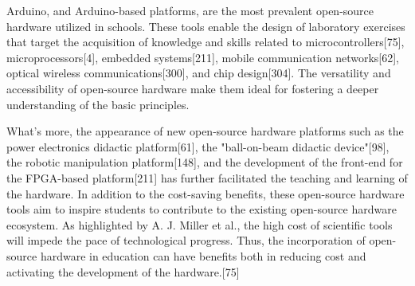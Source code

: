 \documentclass[final-report.tex]{subfiles}
\begin{document}
Arduino, and Arduino-based platforms, are the most prevalent open-source hardware utilized in schools. 
These tools enable the design of laboratory exercises that target the acquisition of knowledge and skills related to microcontrollers[75], microprocessors[4], embedded systems[211], mobile communication networks[62], optical wireless communications[300], and chip design[304]. 
The versatility and accessibility of open-source hardware make them ideal for fostering a deeper understanding of the basic principles.

What's more, the appearance of new open-source hardware platforms such as the power electronics didactic platform[61], the "ball-on-beam didactic device"[98], the robotic manipulation platform[148], and the development of the front-end for the FPGA-based platform[211] has further facilitated the teaching and learning of the hardware. 
In addition to the cost-saving benefits, these open-source hardware tools aim to inspire students to contribute to the existing open-source hardware ecosystem. 
As highlighted by A. J. Miller et al., the high cost of scientific tools will impede the pace of technological progress. 
Thus, the incorporation of open-source hardware in education can have benefits both in reducing cost and activating the development of the hardware.[75]
\end{document}
